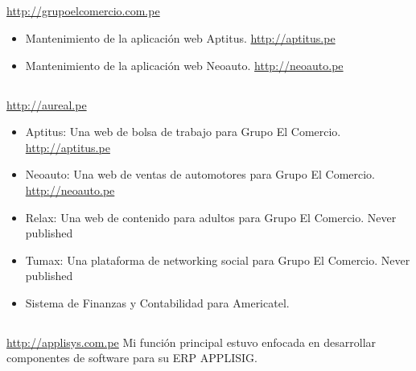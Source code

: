 \documentclass[11pt,a4paper,english]{moderncv}
\begin{document}
\subsection{}

{
\url{http://grupoelcomercio.com.pe}
\newline{}
\begin{itemize}
    \item Mantenimiento de la aplicación web Aptitus.
        \newline{}
        \url{http://aptitus.pe}
    \item Mantenimiento de la aplicación web Neoauto.
        \newline{}
        \url{http://neoauto.pe}
\end{itemize}
}

\subsection{}

{
\url{http://aureal.pe}
\newline{}
\begin{itemize}
    \item Aptitus: Una web de bolsa de trabajo para Grupo El Comercio.
    \newline{}
    \url{http://aptitus.pe}
    \item Neoauto: Una web de ventas de automotores para Grupo El Comercio.
    \newline{}
    \url{http://neoauto.pe}
    \item Relax: Una web de contenido para adultos para Grupo El Comercio.
    \newline{}
    Never published
    \item Tumax: Una plataforma de networking social para Grupo El Comercio.
    \newline{}
    Never published
    \item Sistema de Finanzas y Contabilidad para Americatel.
\end{itemize}
}

\subsection{}

{
\url{http://applisys.com.pe}
\newline{}
Mi función principal estuvo enfocada en desarrollar componentes de software para su ERP APPLISIG.
}
\end{document}
